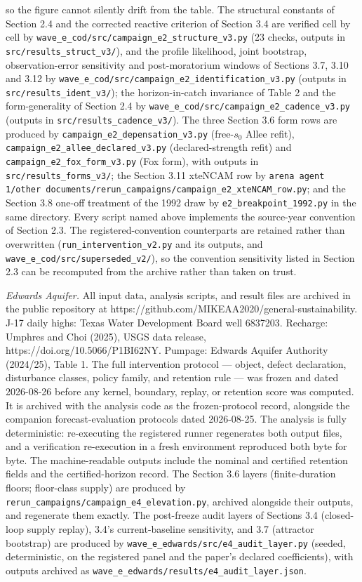 so the figure cannot silently drift from the table. The structural
constants of Section 2.4 and the corrected reactive
criterion of Section 3.4 are verified cell by cell by
\texttt{wave\_e\_cod/src/\allowbreak{}campaign\_e2\_structure\_v3.py} (23 checks,
outputs in \texttt{src/results\_struct\_v3/}), and the profile
likelihood, joint bootstrap, observation-error sensitivity and
post-moratorium windows of Sections 3.7, 3.10 and 3.12 by
\texttt{wave\_e\_cod/src/\allowbreak{}campaign\_e2\_identification\_v3.py}
(outputs in \texttt{src/results\_ident\_v3/}); the horizon-in-catch invariance of Table 2 and the form-generality of Section 2.4 by
\texttt{wave\_e\_cod/src/\allowbreak{}campaign\_e2\_cadence\_v3.py} (outputs in \texttt{src/results\_cadence\_v3/}). The three Section 3.6
form rows are produced by
\texttt{campaign\_e2\_depensation\_v3.py} (free-\(s_0\) Allee refit),
\texttt{campaign\_e2\_allee\_declared\_v3.py} (declared-strength refit)
and \texttt{campaign\_e2\_fox\_form\_v3.py} (Fox form), with outputs in
\texttt{src/results\_forms\_v3/}; the Section 3.11 xteNCAM row by
\texttt{arena agent 1/other documents/rerun\_campaigns/\allowbreak{}campaign\_e2\_xteNCAM\_row.py};
and the Section 3.8 one-off treatment of the 1992 draw by
\texttt{e2\_breakpoint\_1992.py} in the same directory. Every script
named above implements the source-year convention of Section 2.3. The
registered-convention counterparts are retained rather than overwritten
(\texttt{run\_intervention\_v2.py} and its outputs, and
\texttt{wave\_e\_cod/src/superseded\_v2/}), so the convention sensitivity
listed in Section 2.3 can be recomputed from the archive rather than
taken on trust.

\emph{Edwards Aquifer.} All input data, analysis scripts, and result files are archived in the
public repository at
https://github.com/MIKEAA2020/general-sustainability. J-17 daily highs:
Texas Water Development Board well 6837203. Recharge: Umphres and Choi
(2025), USGS data release, https://doi.org/10.5066/P1BI62NY. Pumpage:
Edwards Aquifer Authority (2024/25), Table 1. The full intervention
protocol --- object, defect declaration, disturbance classes, policy
family, and retention rule --- was frozen and dated 2026-08-26 before
any kernel, boundary, replay, or retention score was computed. It is
archived with the analysis code as the frozen-protocol record, alongside
the companion forecast-evaluation protocols dated 2026-08-25. The
analysis is fully deterministic: re-executing the registered runner
regenerates both output files, and a verification re-execution in a
fresh environment reproduced both byte for byte. The machine-readable
outputs include the nominal and certified retention fields and the
certified-horizon record. The Section 3.6 layers (finite-duration
floors; floor-class supply) are produced by
\texttt{rerun\_campaigns/campaign\_e4\_elevation.py}, archived alongside
their outputs, and regenerate them exactly. The post-freeze audit layers
of Sections 3.4 (closed-loop supply replay), 3.4's current-baseline
sensitivity, and 3.7 (attractor bootstrap) are produced by
\texttt{wave\_e\_edwards/src/e4\_audit\_layer.py} (seeded,
deterministic, on the registered panel and the paper's declared
coefficients), with outputs archived as
\texttt{wave\_e\_edwards/results/e4\_audit\_layer.json}.

